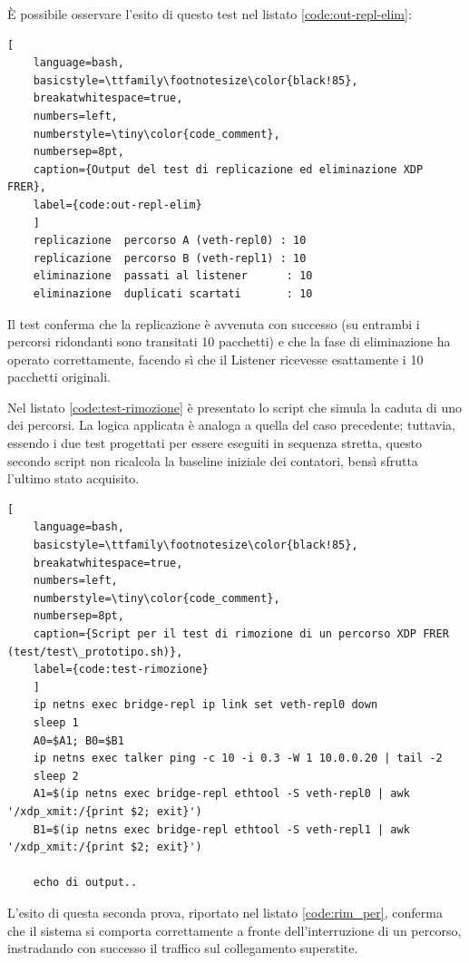 \documentclass[12pt,a4paper,twoside]{book}
\begin{document}
\begin{onehalfspace}
È possibile osservare l'esito di questo test nel listato \ref{code:out-repl-elim}:

\begin{lstlisting}[
    language=bash,
    basicstyle=\ttfamily\footnotesize\color{black!85},
    breakatwhitespace=true,
    numbers=left,
    numberstyle=\tiny\color{code_comment},
    numbersep=8pt,
    caption={Output del test di replicazione ed eliminazione XDP FRER},
    label={code:out-repl-elim}
    ]
    replicazione  percorso A (veth-repl0) : 10
    replicazione  percorso B (veth-repl1) : 10
    eliminazione  passati al listener      : 10
    eliminazione  duplicati scartati       : 10
\end{lstlisting}

Il test conferma che la replicazione è avvenuta con successo (su entrambi i percorsi ridondanti sono transitati 10 pacchetti) e che la fase di eliminazione ha operato correttamente, facendo sì che il Listener ricevesse esattamente i 10 pacchetti originali.

Nel listato \ref{code:test-rimozione} è presentato lo script che simula la caduta di uno dei percorsi. La logica applicata è analoga a quella del caso precedente; tuttavia, essendo i due test progettati per essere eseguiti in sequenza stretta, questo secondo script non ricalcola la baseline iniziale dei contatori, bensì sfrutta l'ultimo stato acquisito.

\begin{lstlisting}[
    language=bash,
    basicstyle=\ttfamily\footnotesize\color{black!85},
    breakatwhitespace=true,
    numbers=left,
    numberstyle=\tiny\color{code_comment},
    numbersep=8pt,
    caption={Script per il test di rimozione di un percorso XDP FRER (test/test\_prototipo.sh)},
    label={code:test-rimozione}
    ]
    ip netns exec bridge-repl ip link set veth-repl0 down
    sleep 1
    A0=$A1; B0=$B1
    ip netns exec talker ping -c 10 -i 0.3 -W 1 10.0.0.20 | tail -2
    sleep 2
    A1=$(ip netns exec bridge-repl ethtool -S veth-repl0 | awk '/xdp_xmit:/{print $2; exit}')
    B1=$(ip netns exec bridge-repl ethtool -S veth-repl1 | awk '/xdp_xmit:/{print $2; exit}')

    echo di output..
\end{lstlisting}

L'esito di questa seconda prova, riportato nel listato \ref{code:rim_per}, conferma che il sistema si comporta correttamente a fronte dell'interruzione di un percorso, instradando con successo il traffico sul collegamento superstite.


\end{onehalfspace}
\end{document}
